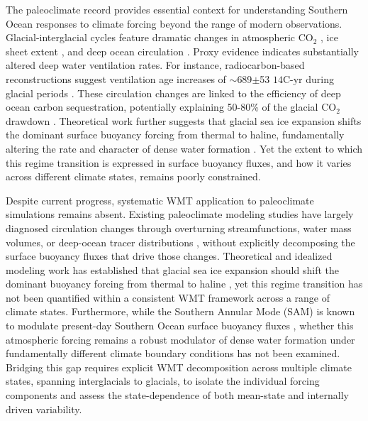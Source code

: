 \documentclass[draft]{agujournal2025}
\begin{document}
The paleoclimate record provides essential context for understanding Southern Ocean responses to climate forcing beyond the range of modern observations. Glacial-interglacial cycles feature dramatic changes in atmospheric CO$_2$ \cite{SigmanBoyle2000,Kohfeld2005}, ice sheet extent \cite{huybrechts1990antarctic}, and deep ocean circulation \cite{rafter2022global}. Proxy evidence indicates substantially altered deep water ventilation rates. For instance, radiocarbon-based reconstructions suggest ventilation age increases of  $\sim$689$\pm$53 ${14}$C-yr during glacial periods \cite{Skinner2017}. These circulation changes are linked to the efficiency of deep ocean carbon sequestration, potentially explaining 50-80\% of the glacial CO$_2$ drawdown \cite{Ferrari2014,Skinner2017}. Theoretical work further suggests that glacial sea ice expansion shifts the dominant surface buoyancy forcing from thermal to haline, fundamentally altering the rate and character of dense water formation \cite{Ferrari2014,Marzocchi2017}. Yet the extent to which this regime transition is expressed in surface buoyancy fluxes, and how it varies across different climate states, remains poorly constrained.

Despite current progress, systematic WMT application to paleoclimate simulations remains absent.  Existing paleoclimate modeling studies have largely diagnosed circulation changes through overturning streamfunctions, water mass volumes, or deep-ocean tracer distributions \cite{Weber2007,Wainer2012}, without explicitly decomposing the surface buoyancy fluxes that drive those changes. Theoretical and idealized modeling work has established that glacial sea ice expansion should shift the dominant buoyancy forcing from thermal to haline \cite{Ferrari2014,Marzocchi2017}, yet this regime transition has not been quantified within a consistent WMT framework across a range of climate states. Furthermore, while the Southern Annular Mode (SAM) is known to modulate present-day Southern Ocean surface buoyancy fluxes \cite{Sallee2010}, whether this atmospheric forcing remains a robust modulator of dense water formation under fundamentally different climate boundary conditions has not been examined. Bridging this gap requires explicit WMT decomposition across multiple climate states, spanning interglacials to glacials, to isolate the individual forcing components and assess the state-dependence of both mean-state and internally driven variability.



\end{document}
